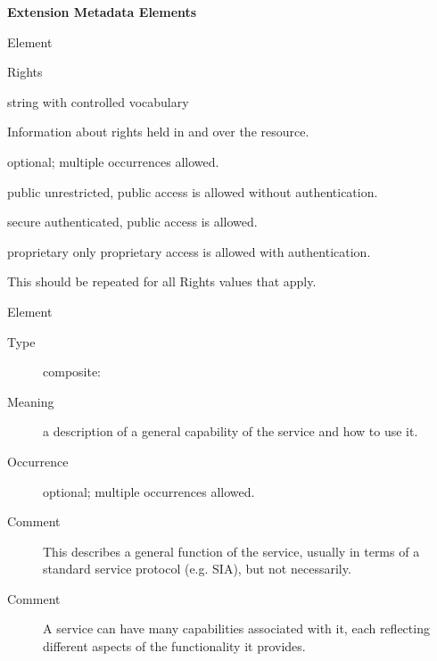 \documentclass[11pt,a4paper]{ivoa}
\begin{document}
\vspace{0.5ex}\noindent\textbf{ Extension Metadata Elements}

\begingroup\small\begin{bigdescription}\item[Element \xmlel{rights}]
\begin{description}
Rights
\item[Type] string with controlled vocabulary
\item[Meaning] 
                       Information about rights held in and over the resource.
                     
\item[Occurrence] optional; multiple occurrences allowed.

\item[Allowed Values]\hfil
\begin{longtermsdescription}
\item[public]
                  unrestricted, public access is allowed without 
                  authentication.
               
\item[secure]
                  authenticated, public access is allowed.
               
\item[proprietary]
                  only proprietary access is allowed with authentication.
               
\end{longtermsdescription}
\item[Comment] 
                       This should be repeated for all Rights values that apply.
                     

\end{description}
\item[Element \xmlel{capability}]
\begin{description}
\item[Type] composite: 
\item[Meaning] 
                        a description of a general capability of the
                        service and how to use it.
                     
\item[Occurrence] optional; multiple occurrences allowed.
\item[Comment] 
                        This describes a general function of the
                        service, usually in terms of a standard
                        service protocol (e.g. SIA), but not
                        necessarily.  
                     
\item[Comment] 
                        A service can have many capabilities
                        associated with it, each reflecting different
                        aspects of the functionality it provides.  
                     

\end{description}


\end{bigdescription}\endgroup
\end{document}
